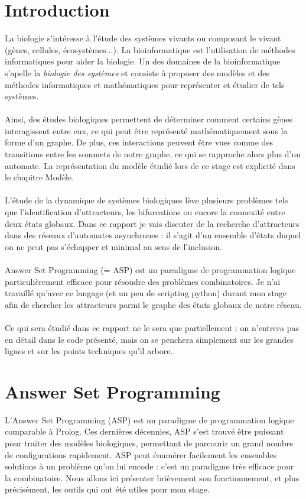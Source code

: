 \documentclass[12pt,a4paper]{article}
\begin{document}
\section{Introduction}
La biologie s'intéresse à l'étude des systèmes vivants ou composant le vivant (gènes, cellules, écosystèmes...). La bioinformatique est l'utilisation de méthodes informatiques pour aider la biologie. Un des domaines de la 
bioinformatique s'apelle la \emph{biologie des systèmes} et consiste à proposer des modèles et des méthodes informatiques et mathématiques pour représenter et étudier de tels systèmes.\\ \\
Ainsi, des études biologiques permettent de déterminer comment certains gènes interagissent entre eux, ce qui peut être représenté mathématiquement sous la forme d'un graphe. De plus, ces interactions peuvent être vues comme des 
transitions entre les sommets de notre graphe, ce qui se rapproche alors plus d'un automate. La représentation du modèle étudié lors de ce stage est explicité dans le chapitre Modèle.\\ \\
L'étude de la dynamique de systèmes biologiques lève plusieurs problèmes tels que l'identification d'attracteurs, les bifurcations ou encore la connexité entre deux états globaux. Dans ce rapport je vais discuter de la recherche 
d'attracteurs dans des réseaux d'automates asynchrones : il s'agit d'un ensemble d'états duquel on ne peut pas s'échapper et minimal au sens de l'inclusion.\\ \\
Answer Set Programming (= ASP) est un paradigme de programmation logique particulièrement efficace pour résoudre des problèmes combinatoires. Je n'ai travaillé qu'avec ce langage (et un peu de scripting python) 
durant mon stage afin de chercher les attracteurs parmi le graphe des états globaux de notre réseau.\\ \\
Ce qui sera étudié dans ce rapport ne le sera que partiellement : on n'entrera pas en détail dans le code présenté, mais on se penchera simplement sur les grandes lignes et sur les points techniques qu'il arbore.

\section{Answer Set Programming}
L'Answer Set Programming (ASP) est un paradigme de programmation logique comparable à Prolog. Ces dernières décennies, ASP s'est trouvé être puissant pour traiter des modèles biologiques, permettant de parcourir un 
grand nombre de configurations rapidement. ASP peut énumérer facilement les ensembles solutions à un problème qu'on lui encode : c'est un paradigme très efficace pour la combinatoire. Nous allons ici présenter brièvement 
son fonctionnement, et plus précisément, les outils qui ont été utiles pour mon stage.
\end{document}
